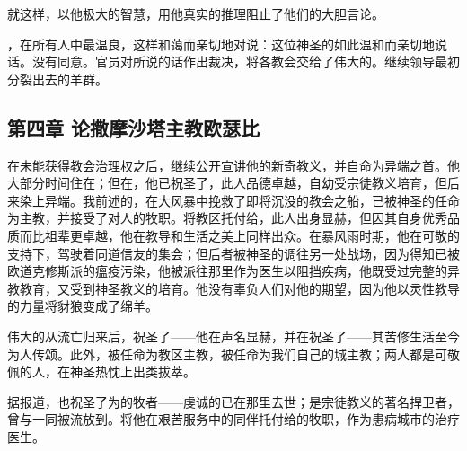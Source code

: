就这样，以他极大的智慧，用他真实的推理阻止了他们的大胆言论。\par

，在所有人中最温良，这样和蔼而亲切地对说：这位神圣的如此温和而亲切地说话。没有同意。官员对所说的话作出裁决，将各教会交给了伟大的。继续领导最初分裂出去的羊群。\par


\subsection{第四章 论撒摩沙塔主教欧瑟比}

在未能获得教会治理权之后，继续公开宣讲他的新奇教义，并自命为异端之首。他大部分时间住在；但在，他已祝圣了，此人品德卓越，自幼受宗徒教义培育，但后来染上异端。我前述的，在大风暴中挽救了即将沉没的教会之船，已被神圣的任命为主教，并接受了对人的牧职。将教区托付给，此人出身显赫，但因其自身优秀品质而比祖辈更卓越，他在教导和生活之美上同样出众。在暴风雨时期，他在可敬的支持下，驾驶着同道信友的集会；但后者被神圣的调往另一处战场，因为得知已被欧道克修斯派的瘟疫污染，他被派往那里作为医生以阻挡疾病，他既受过完整的异教教育，又受到神圣教义的培育。他没有辜负人们对他的期望，因为他以灵性教导的力量将豺狼变成了绵羊。\par

伟大的从流亡归来后，祝圣了——他在声名显赫，并在祝圣了——其苦修生活至今为人传颂。此外，被任命为教区主教，被任命为我们自己的城主教；两人都是可敬佩的人，在神圣热忱上出类拔萃。\par

据报道，也祝圣了为的牧者——虔诚的已在那里去世；是宗徒教义的著名捍卫者，曾与一同被流放到。将他在艰苦服务中的同伴托付给的牧职，作为患病城市的治疗医生。\par

